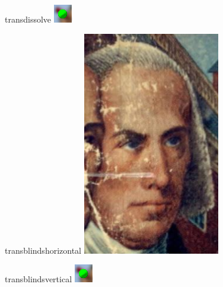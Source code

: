 \documentclass{beamer}
\begin{document}

\begin{frame}{transdissolve}
    \transdissolve
    \includegraphics{b.png}
\end{frame}

\begin{frame}{transblindshorizontal}
    \transblindshorizontal
    \includegraphics{a.png}
\end{frame}

\begin{frame}{transblindsvertical}
    \transblindsvertical
    \includegraphics{b.png}
\end{frame}
\end{document}
